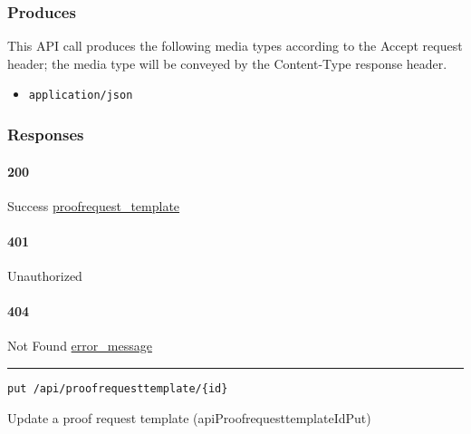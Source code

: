 \hypertarget{produces-170}{%
\subsubsection{Produces}\label{produces-170}}

This API call produces the following media types according to the
{Accept} request header; the media type will be conveyed by the
{Content-Type} response header.

\begin{itemize}
\tightlist
\item
  \texttt{application/json}
\end{itemize}

\hypertarget{responses-175}{%
\subsubsection{Responses}\label{responses-175}}

\hypertarget{section-564}{%
\paragraph{200}\label{section-564}}

Success
\protect\hyperlink{proofrequest_template}{proofrequest\_template}

\hypertarget{section-565}{%
\paragraph{401}\label{section-565}}

Unauthorized \protect\hyperlink{}{}

\hypertarget{section-566}{%
\paragraph{404}\label{section-566}}

Not Found \protect\hyperlink{error_message}{error\_message}

\begin{center}\rule{0.5\linewidth}{\linethickness}\end{center}

\protect\hypertarget{apiProofrequesttemplateIdPut}{}{}

\begin{verbatim}
put /api/proofrequesttemplate/{id}
\end{verbatim}

Update a proof request template ({apiProofrequesttemplateIdPut})

